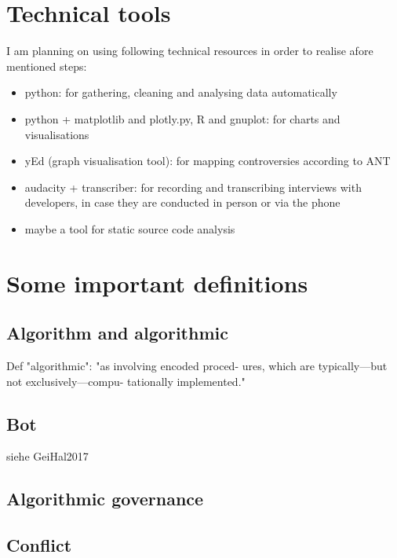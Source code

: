 \documentclass[pdftex,a4paper,11pt]{scrartcl}
\begin{document}
\section{Technical tools}

I am planning on using following technical resources in order to realise afore mentioned steps:

\begin{itemize}
    \item python: for gathering, cleaning and analysing data automatically
    \item python + matplotlib and plotly.py, R and gnuplot: for charts and visualisations
    \item yEd (graph visualisation tool): for mapping controversies according to ANT
    \item audacity + transcriber: for recording and transcribing interviews with developers, in case they are conducted in person or via the phone
    \item maybe a tool for static source code analysis
\end{itemize}

\section{Some important definitions}

\subsection{Algorithm and algorithmic}
Def "algorithmic": "as involving encoded proced-
ures, which are typically—but not exclusively—compu-
tationally implemented."~\cite{Geiger2017}

\subsection{Bot}
siehe GeiHal2017

\subsection{Algorithmic governance}

\subsection{Conflict}
\end{document}
